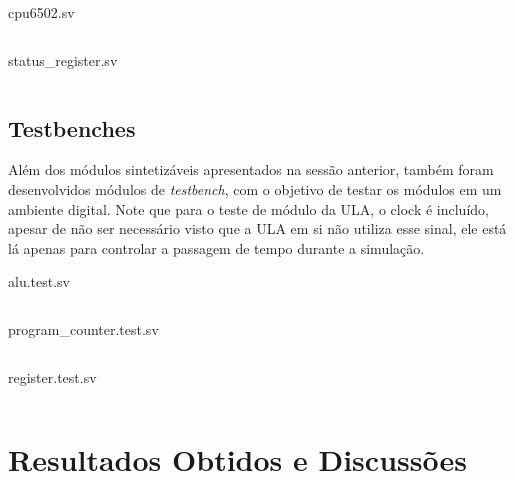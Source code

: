 \documentclass[
	12pt,				  %
	openright,		%
	a4paper,			%
	english,			%
	french,				%
	spanish,			%
	brazil,				%
]{abntex2}
\newenvironment{longlisting}{\captionsetup{type=listing}}{}
\begin{document}
\begin{longlisting}
	\caption[Módulo Processador]{cpu6502.sv}
	\inputminted{systemverilog}{../quartus/synthesis/cpu6502.sv}
	\label{code:cpu}
\end{longlisting}

\begin{longlisting}
	\caption[Módulo Registrador de Status]{status{\_}register.sv}
	\inputminted{systemverilog}{../quartus/synthesis/status_register.sv}
	\label{code:status_register}
\end{longlisting}



\section{Testbenches}\label{sec:testbenches}

Além dos módulos sintetizáveis apresentados na sessão anterior, também foram
desenvolvidos módulos de \emph{testbench}, com o objetivo de testar os módulos em um ambiente
digital. Note que para o teste de módulo da ULA, o clock é incluído, apesar de não ser necessário
visto que a ULA em si não utiliza esse sinal, ele está lá apenas para controlar a passagem de tempo
durante a simulação.

\begin{longlisting}
	\caption[Testbench da ULA]{alu.test.sv}
	\inputminted{systemverilog}{../quartus/testbenches/alu.test.sv}
	\label{code:alu_test}
\end{longlisting}

\begin{longlisting}
	\caption[Testbench do Contador de Programa]{program{\_}counter.test.sv}
	\inputminted{systemverilog}{../quartus/testbenches/program_counter.test.sv}
	\label{code:program_counter_test}
\end{longlisting}

\begin{longlisting}
	\caption[Testbench do Módulo Registrador]{register.test.sv}
	\inputminted{systemverilog}{../quartus/testbenches/register.test.sv}
	\label{code:register_test}
\end{longlisting}

\chapter{Resultados Obtidos e Discussões}


\end{document}
